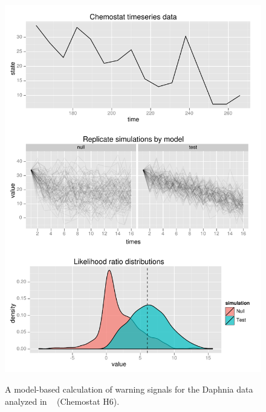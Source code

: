 \documentclass[authoryear,preprint,11pt]{elsarticle}
\begin{document}
 \begin{figure}
   \begin{center}
     \includegraphics{figures/Chemostat_warningsignal.pdf}
     \label{fig:chemostat}
     \caption{A model-based calculation of warning signals for the Daphnia data analyzed in ~\citet{Drake2010} (Chemostat H6).}
  \end{center}
 \end{figure}
\end{document}
